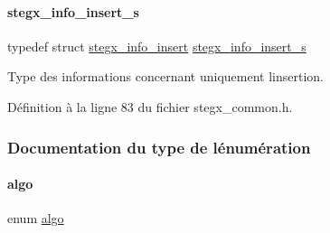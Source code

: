 \paragraph{\texorpdfstring{stegx\+\_\+info\+\_\+insert\+\_\+s}{stegx\_info\_insert\_s}}
{\footnotesize\ttfamily typedef struct \hyperlink{a00138}{stegx\+\_\+info\+\_\+insert} \hyperlink{a00008_a176cafec595278af1f86f1e9ef478cb0}{stegx\+\_\+info\+\_\+insert\+\_\+s}}

Type des informations concernant uniquement l\textquotesingle{}insertion. 

Définition à la ligne 83 du fichier stegx\+\_\+common.\+h.



\subsubsection{Documentation du type de l\textquotesingle{}énumération}
\mbox{\label{a00008_ad3066b71c7c05f99ce6c3bd88da7ac23}} 
\paragraph{\texorpdfstring{algo}{algo}}
{\footnotesize\ttfamily enum \hyperlink{a00008_ad3066b71c7c05f99ce6c3bd88da7ac23}{algo}}

